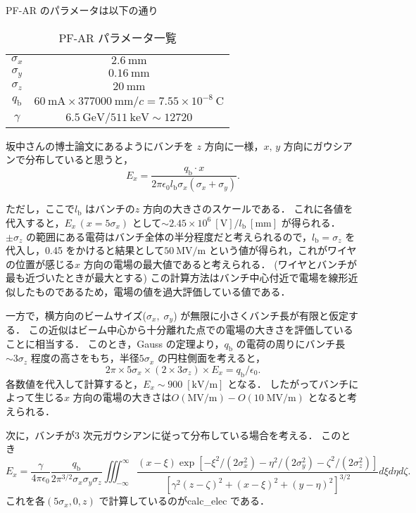 \documentclass{jsarticle}
\begin{document}
PF-AR のパラメータは以下の通り
\begin{table}[h]
\centering
\caption{PF-AR パラメータ一覧\label{tab:pfarparameter}}
\begin{tabular}{cc} \hline
$\sigma_x$ & $2.6~\mathrm{mm}$ \\ 
$\sigma_y$ & $0.16~\mathrm{mm}$ \\ 
$\sigma_z$ & $20~\mathrm{mm}$ \\ 
$q_\mathrm{b}$ & $60~\mathrm{mA} \times 377000~\mathrm{mm}/c = 7.55 \times 10^{-8}~\mathrm{C}$ \\
$\gamma$ & $6.5~\mathrm{GeV}/511~\mathrm{keV} \sim 12720$ \\ \hline
\end{tabular}
\end{table}

坂中さんの博士論文にあるようにバンチを $z$ 方向に一様，$x,\,y$ 方向にガウシアンで分布していると思うと，
\begin{equation}
E_x = \frac{q_\mathrm{b} \cdot x}{2\pi \epsilon_0 l_\mathrm{b}\sigma_x(\sigma_x + \sigma_y)}.
\end{equation}

ただし，ここで$l_\mathrm{b}$ はバンチの$z$ 方向の大きさのスケールである．
これに各値を代入すると，$E_x\,(x = 5\sigma_x)$ として$\sim 2.45 \times 10^6~[\mathrm{V}] /l_\mathrm{b}~[\mathrm{mm}]$ が得られる．
$\pm \sigma_z$ の範囲にある電荷はバンチ全体の半分程度だと考えられるので，$l_\mathrm{b} = \sigma_z$ を代入し，0.45 をかけると結果として$50~\mathrm{MV/m}$ という値が得られ，これがワイヤの位置が感じる$x$ 方向の電場の最大値であると考えられる．
(ワイヤとバンチが最も近づいたときが最大とする)
この計算方法はバンチ中心付近で電場を線形近似したものであるため，電場の値を過大評価している値である．

一方で，横方向のビームサイズ($\sigma_x,\;\sigma_y$) が無限に小さくバンチ長が有限と仮定する．
この近似はビーム中心から十分離れた点での電場の大きさを評価していることに相当する．
このとき，Gauss の定理より，$q_\mathrm{b}$ の電荷の周りにバンチ長$\sim 3 \sigma_z$ 程度の高さをもち，半径$5\sigma_x$ の円柱側面を考えると，
\begin{equation}
2 \pi \times 5\sigma_x \times (2 \times 3 \sigma_z) \times E_x = q_\mathrm{b} / \epsilon_0.
\end{equation}
各数値を代入して計算すると，$E_x \sim 900\;[\mathrm{kV/m}]$ となる．
したがってバンチによって生じる$x$ 方向の電場の大きさは$O(\mathrm{MV/m}) - O(10\;\mathrm{MV/m})$ となると考えられる．

次に，バンチが3 次元ガウシアンに従って分布している場合を考える．
このとき
\begin{equation}
E_x = \frac{\gamma}{4\pi\epsilon_0}\frac{q_\mathrm{b}}{2\pi^{3/2}\sigma_x\sigma_y\sigma_z}\iiint_{-\infty}^\infty\frac{(x - \xi)\exp[-\xi^2/(2\sigma_x^2)-\eta^2/(2\sigma_y^2)-\zeta^2/(2\sigma_z^2)]}{[\gamma^2(z-\zeta)^2 + (x - \xi)^2 + (y - \eta)^2]^{3/2}}d\xi d\eta d\zeta.
\end{equation}
これを各$(5\sigma_x, 0, z)$ で計算しているのがcalc\_elec である．
\end{document}

